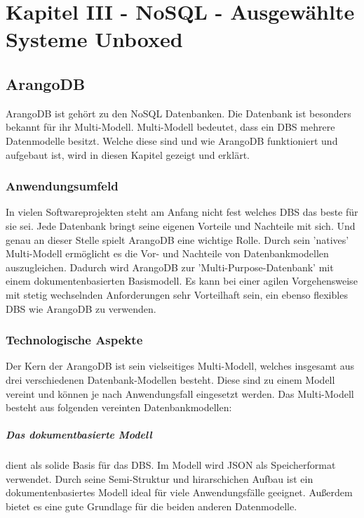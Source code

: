 \chapter{Kapitel III - NoSQL - Ausgewählte Systeme Unboxed}
\setcounter{section}{7}
\section{ArangoDB}
ArangoDB ist gehört zu den \ac{NoSQL} Datenbanken. Die Datenbank ist besonders bekannt für ihr Multi-Modell. Multi-Modell bedeutet, dass ein \ac{DBS} mehrere Datenmodelle besitzt. Welche diese sind und wie ArangoDB funktioniert und aufgebaut ist, wird in diesen Kapitel gezeigt und erklärt.
\subsection{Anwendungsumfeld}
In vielen Softwareprojekten steht am Anfang nicht fest welches \ac{DBS} das beste für sie sei. Jede Datenbank bringt seine eigenen Vorteile und Nachteile mit sich. Und genau an dieser Stelle spielt ArangoDB eine wichtige Rolle.
Durch sein ’natives’ Multi-Modell ermöglicht es die Vor- und Nachteile von Datenbankmodellen auszugleichen. Dadurch wird ArangoDB zur ’Multi-Purpose-Datenbank’ mit einem dokumentenbasierten Basismodell\cite{jaxenter01}. Es kann bei einer agilen Vorgehensweise mit stetig wechselnden Anforderungen sehr Vorteilhaft sein, ein ebenso flexibles DBS wie ArangoDB zu verwenden.

 \subsection{Technologische Aspekte}
Der Kern der ArangoDB ist sein vielseitiges Multi-Modell, welches insgesamt aus drei verschiedenen Datenbank-Modellen besteht. Diese sind zu einem Modell vereint und können je nach Anwendungsfall eingesetzt werden. Das Multi-Modell besteht aus folgenden  vereinten Datenbankmodellen:

\paragraph{Das dokumentbasierte Modell} dient als solide Basis für das \ac{DBS}. Im Modell wird \ac{JSON} als Speicherformat verwendet. Durch seine Semi-Struktur und hirarschichen Aufbau ist  ein dokumentenbasiertes Modell ideal für viele Anwendungsfälle geeignet\cite{AWS_doc}.  Außerdem bietet es eine gute Grundlage für die beiden anderen Datenmodelle.

